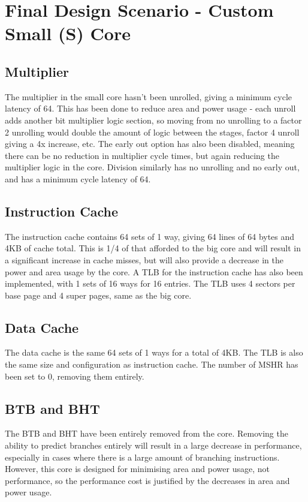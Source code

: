 \section{Final Design Scenario - Custom Small (S) Core}
\subsection{Multiplier}
The multiplier in the small core hasn't been unrolled, giving a minimum cycle latency of 64. This has been done to reduce area and power usage - each unroll adds another bit multiplier logic section, so moving from no unrolling to a factor 2 unrolling would double the amount of logic between the stages, factor 4 unroll giving a 4x increase, etc. The early out option has also been disabled, meaning there can be no reduction in multiplier cycle times, but again reducing the multiplier logic in the core. Division similarly has no unrolling and no early out, and has a minimum cycle latency of 64.

\subsection{Instruction Cache}
The instruction cache contains 64 sets of 1 way, giving 64 lines of 64 bytes and 4KB of cache total. This is 1/4 of that afforded to the big core and will result in a significant increase in cache misses, but will also provide a decrease in the power and area usage by the core. A TLB for the instruction cache has also been implemented, with 1 sets of 16 ways for 16 entries. The TLB uses 4 sectors per base page and 4 super pages, same as the big core.

\subsection{Data Cache}
The data cache is the same 64 sets of 1 ways for a total of 4KB. The TLB is also the same size and configuration as instruction cache. The number of MSHR has been set to 0, removing them entirely.

\subsection{BTB and BHT}
The BTB and BHT have been entirely removed from the core. Removing the ability to predict branches entirely will result in a large decrease in performance, especially in cases where there is a large amount of branching instructions. However, this core is designed for minimising area and power usage, not performance, so the performance cost is justified by the decreases in area and power usage.

